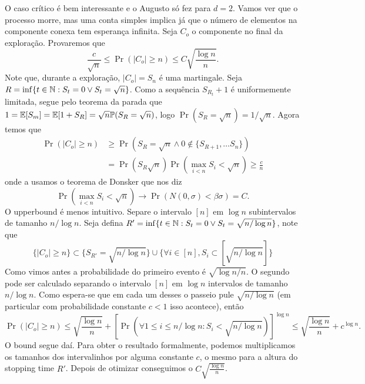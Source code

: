 O caso crítico é bem interessante e o Augusto só fez para $d = 2$.
Vamos ver que o processo morre, mas uma conta simples implica já que o número
de elementos na componente conexa tem esperança infinita. Seja $C_o$
o componente no final da exploração. Provaremos que
\[
	\frac{c}{\sqrt{n}} \leq \Pr(|C_o| \geq n) \leq C\sqrt{\frac{\log n}{n}}.
\]
Note que, durante a exploração, $|C_o| = S_n$ é uma martingale. Seja
$R = \inf \{t \in \mathbb{N}: S_t = 0 \lor S_t = \sqrt{n}\}$. Como a
sequência $S_{R_t} + 1$ é uniformemente
limitada, segue pelo teorema da parada que $1 = \mathbb{E}[S_m] = \mathbb{E}[1 +
S_R] = \sqrt{n}\mathbb{P}(S_R = \sqrt{n})$, logo $\Pr(S_R = \sqrt{n}) = 1/\sqrt{n}$.
Agora temos que
\begin{align}
	\Pr(|C_o| \geq n) & \geq \Pr(S_R = \sqrt{n} \land 0 \not \in
	\{S_{R+1}, \dots S_{n}\})
	\\
	& = \Pr(S_R \sqrt{n}) \Pr(\max_{i < n} S_i < \sqrt{n}) \geq \frac{c}{n}
\end{align}
onde a usamos o teorema de Donsker que nos diz
\[
	\Pr(\max_{i < n} S_i < \sqrt{n}) \to \Pr(N(0,\sigma) < \beta\sigma) = C.
\]
O upperbound é menos intuitivo. Separe o intervalo $[n]$ em $\log n$
subintervalos de tamanho $n/\log n$.
Seja defina $R' = \inf\{t \in \mathbb{N} : S_t = 0 \lor S_t = \sqrt{n/\log
n}\}$, note que
\[
	\{|C_o| \geq n\} \subset \{S_{R'} = \sqrt{n/\log n}\} \cup \{\forall
	i \in [n], S_i \subset [\sqrt{n / \log n}]\}
\]
Como vimos antes a probabilidade do primeiro evento é $\sqrt{\log n /
n}$. O segundo pode ser calculado
separando o intervalo $[n]$ em $\log n$ intervalos de tamanho $n/\log
n$. Como espera-se que em cada um desses
o passeio pule $\sqrt{n/\log n}$ (em particular com probabilidade
constante $c < 1$ isso acontece), então
\[
	\Pr(|C_o| \geq n) \leq \sqrt{\frac{\log n}{n}} + [\Pr(\forall 1 \leq
	i \leq n/\log n : S_i < \sqrt{n/\log n})]^{\log n} \leq
	\sqrt{\frac{\log n}{n}} + c^{\log n}.
\]
O bound segue daí. Para obter o resultado formalmente, podemos
multiplicamos os tamanhos dos intervalinhos
por alguma constante $c$, o mesmo para a altura do stopping time $R'$.
Depois de otimizar conseguimos
o $C\sqrt{\frac{\log n}{n}}$.
